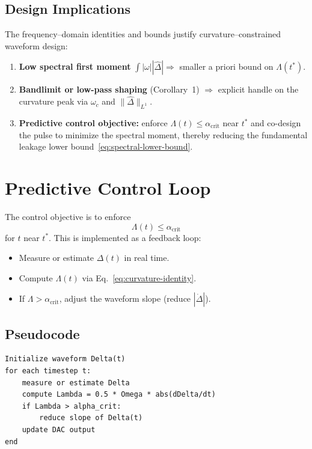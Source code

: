 \documentclass[11pt]{article}
\begin{document}
\subsection{Design Implications}

The frequency--domain identities and bounds justify curvature--constrained waveform design:

\begin{enumerate}
    \item \textbf{Low spectral first moment} $\int |\omega| |\hat{\Delta}| \Rightarrow$ smaller a priori bound on $\Lambda(t^*)$.
    \item \textbf{Bandlimit or low-pass shaping} (Corollary~1) $\Rightarrow$ explicit handle on the curvature peak via $\omega_c$ and $\|\hat{\Delta}\|_{L^1}$.
    \item \textbf{Predictive control objective:} enforce $\Lambda(t) \le \alpha_{\mathrm{crit}}$ near $t^*$ and co-design the pulse to minimize the spectral moment, thereby reducing the fundamental leakage lower bound~\eqref{eq:spectral-lower-bound}.
\end{enumerate}

\section{Predictive Control Loop}

The control objective is to enforce
\[
    \Lambda(t) \le \alpha_{\mathrm{crit}}
\]
for $t$ near $t^*$. This is implemented as a feedback loop:

\begin{itemize}
    \item Measure or estimate $\Delta(t)$ in real time.
    \item Compute $\Lambda(t)$ via Eq.~\eqref{eq:curvature-identity}.
    \item If $\Lambda > \alpha_{\mathrm{crit}}$, adjust the waveform slope (reduce $|\dot{\Delta}|$).
\end{itemize}

\subsection{Pseudocode}

\begin{verbatim}
Initialize waveform Delta(t)
for each timestep t:
    measure or estimate Delta
    compute Lambda = 0.5 * Omega * abs(dDelta/dt)
    if Lambda > alpha_crit:
        reduce slope of Delta(t)
    update DAC output
end
\end{verbatim}
\end{document}
